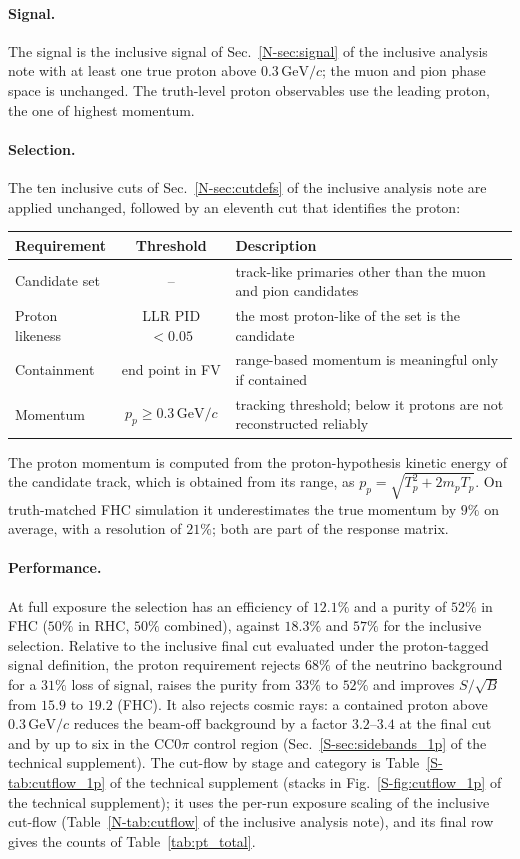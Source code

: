 \documentclass[11pt,a4paper]{article}
\newcommand{\GeVc}{\,\text{GeV}\!/c}
\newcommand{\suppref}[2]{#1~\ref{S-#2} of the technical supplement}
\newcommand{\noteref}[2]{#1~\ref{N-#2} of the inclusive analysis note}
\begin{document}
\paragraph{Signal.} The signal is the inclusive signal of \noteref{Sec.}{sec:signal} with at least
one true proton above $0.3\GeVc$; the muon and pion phase space is unchanged. The truth-level
proton observables use the leading proton, the one of highest momentum.

\paragraph{Selection.} The ten inclusive cuts of \noteref{Sec.}{sec:cutdefs} are applied unchanged,
followed by an eleventh cut that identifies the proton:
\begin{center}\small
\begin{tabular}{lcp{8.6cm}}
\toprule
Requirement & Threshold & Description \\
\midrule
Candidate set & -- & track-like primaries other than the muon and pion candidates \\
Proton likeness & LLR PID $<0.05$ & the most proton-like of the set is the candidate \\
Containment & end point in FV & range-based momentum is meaningful only if contained \\
Momentum & $p_p\ge0.3\GeVc$ & tracking threshold; below it protons are not reconstructed reliably \\
\bottomrule
\end{tabular}
\end{center}
\noindent The proton momentum is computed from the proton-hypothesis kinetic energy of the candidate
track, which is obtained from its range, as $p_p=\sqrt{T_p^2+2m_pT_p}$. On truth-matched FHC
simulation it underestimates the true momentum by $9\%$ on average, with a resolution of $21\%$;
both are part of the response matrix.

\paragraph{Performance.} At full exposure the selection has an efficiency of $12.1\%$ and a purity of
$52\%$ in FHC ($50\%$ in RHC, $50\%$ combined), against $18.3\%$ and $57\%$ for the inclusive
selection. Relative to the inclusive final cut evaluated under the proton-tagged signal definition,
the proton requirement rejects $68\%$ of the neutrino background for a $31\%$ loss of signal,
raises the purity from $33\%$ to $52\%$ and improves $S/\sqrt{B}$ from $15.9$ to $19.2$ (FHC). It
also rejects cosmic rays: a contained proton above $0.3\GeVc$ reduces the beam-off background by a
factor $3.2$--$3.4$ at the final cut and by up to six in the CC$0\pi$ control region
(\suppref{Sec.}{sec:sidebands_1p}). The cut-flow by stage and category is
\suppref{Table}{tab:cutflow_1p} (stacks in \suppref{Fig.}{fig:cutflow_1p}); it uses the per-run
exposure scaling of the inclusive cut-flow (\noteref{Table}{tab:cutflow}), and its final row gives
the counts of Table~\ref{tab:pt_total}.
\end{document}
